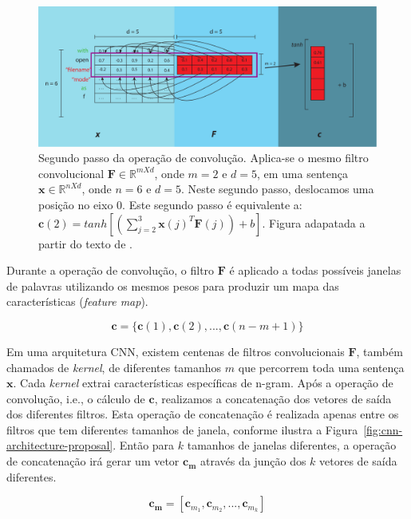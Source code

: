 \begin{figure}[h]
    \centering
    \includegraphics[width=1\textwidth]{figuras/cap-problema/second-step-convolution.pdf}
    \caption{Segundo passo da operação de convolução. Aplica-se o mesmo filtro convolucional $\bm{F} \in \mathbb{R}^{m X d}$, onde $m = 2$ e $d = 5$, em uma sentença $\bm{x} \in \mathbb{R}^{n X d}$, onde $n = 6$ e $d = 5$. Neste segundo passo, deslocamos uma posição no eixo $0$. Este segundo passo é equivalente a: $\bm{c}(2) = tanh [(\sum_{j=2}^{3} \bm{x}(j)^{T}\bm{F}(j)) + b]$. Figura adapatada a partir do texto de \cite{joshua-kim-cnn-understanding-word-embeddings-2019}.}
    \label{fig:second-step-convolutional}
\end{figure}


Durante a operação de convolução, o filtro $\bm{F}$ é aplicado a todas possíveis janelas de palavras utilizando os mesmos pesos para produzir um mapa das características (\textit{feature map}).

\begin{equation}
    \bm{c} = \{ \bm{c}(1), \bm{c}(2), . . ., \bm{c}(n - m + 1) \} 
\end{equation}




Em uma arquitetura CNN, existem centenas de filtros convolucionais $\bm{F}$, também chamados de \textit{kernel}, de diferentes tamanhos $m$ que percorrem toda uma sentença $\bm{x}$. Cada \textit{kernel} extrai características específicas de n-gram. Após a operação de convolução, i.e., o cálculo de $\bm{c}$, realizamos a concatenação dos vetores de saída dos diferentes filtros.
Esta operação de concatenação é realizada apenas entre os filtros que tem diferentes tamanhos de janela, conforme ilustra a Figura~\ref{fig:cnn-architecture-proposal}.
Então para $k$ tamanhos de janelas diferentes, a operação de concatenação irá gerar um vetor $\bm{c}_{\bm{m}}$ através da junção dos $k$ vetores de saída diferentes.

\begin{equation}\label{eq:concatenacao-cnn-cm}
    \bm{c}_{\bm{m}} = \left[\bm{c}_{m_1}, \bm{c}_{m_2}, . . ., \bm{c}_{m_{k}}\right]
\end{equation}

